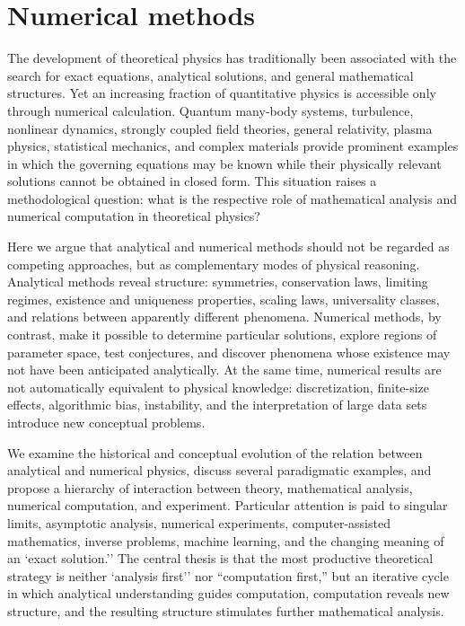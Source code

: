\chapter{Numerical methods}
\label{numeric}
The development of theoretical physics has traditionally been associated with
the search for exact equations, analytical solutions, and general mathematical
structures. Yet an increasing fraction of quantitative physics is accessible
only through numerical calculation. Quantum many-body systems, turbulence,
nonlinear dynamics, strongly coupled field theories, general relativity, plasma
physics, statistical mechanics, and complex materials provide prominent
examples in which the governing equations may be known while their physically
relevant solutions cannot be obtained in closed form. This situation raises a
methodological question: what is the respective role of mathematical analysis
and numerical computation in theoretical physics?

Here we argue that analytical and numerical methods should not be regarded
as competing approaches, but as complementary modes of physical reasoning.
Analytical methods reveal structure: symmetries, conservation laws, limiting
regimes, existence and uniqueness properties, scaling laws, universality
classes, and relations between apparently different phenomena. Numerical
methods, by contrast, make it possible to determine particular solutions,
explore regions of parameter space, test conjectures, and discover phenomena
whose existence may not have been anticipated analytically. At the same time,
numerical results are not automatically equivalent to physical knowledge:
discretization, finite-size effects, algorithmic bias, instability, and the
interpretation of large data sets introduce new conceptual problems.

We examine the historical and conceptual evolution of the relation between
analytical and numerical physics, discuss several paradigmatic examples, and
propose a hierarchy of interaction between theory, mathematical analysis,
numerical computation, and experiment. Particular attention is paid to singular
limits, asymptotic analysis, numerical experiments, computer-assisted
mathematics, inverse problems, machine learning, and the changing meaning of an
`exact solution.'' The central thesis is that the most productive theoretical
strategy is neither `analysis first'' nor ``computation first,'' but an
iterative cycle in which analytical understanding guides computation,
computation reveals new structure, and the resulting structure stimulates
further mathematical analysis.

